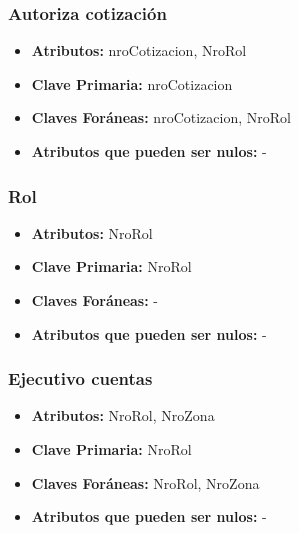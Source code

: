 \documentclass[a4paper,11pt]{article}
\begin{document}
\subsubsection{Autoriza cotización}

\begin{itemize}

	\item \textbf{Atributos:} nroCotizacion, NroRol
	
	\item \textbf{Clave Primaria:} nroCotizacion
	
	\item \textbf{Claves Foráneas:} nroCotizacion, NroRol
	
	\item \textbf{Atributos que pueden ser nulos:} -
	
\end{itemize}

\subsubsection{Rol}

\begin{itemize}

	\item \textbf{Atributos:} NroRol
	
	\item \textbf{Clave Primaria:} NroRol
	
	\item \textbf{Claves Foráneas:} -
	
	\item \textbf{Atributos que pueden ser nulos:} -
	
\end{itemize}

\subsubsection{Ejecutivo cuentas}

\begin{itemize}

	\item \textbf{Atributos:} NroRol, NroZona
	
	\item \textbf{Clave Primaria:} NroRol
	
	\item \textbf{Claves Foráneas:} NroRol, NroZona
	
	\item \textbf{Atributos que pueden ser nulos:} -
	
\end{itemize}
\end{document}
